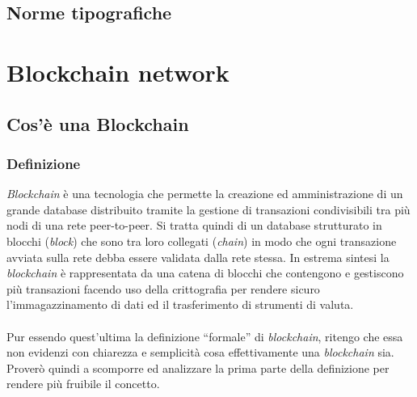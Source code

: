 \documentclass[11pt]{thesistemp}
\begin{document}
\subsection{Norme tipografiche}


\pagebreak
\section{Blockchain network}

\subsection{Cos'è una Blockchain}

\subsubsection{Definizione}

\textit{Blockchain} è una tecnologia che permette la creazione ed amministrazione di un grande database
distribuito tramite la gestione di transazioni condivisibili tra più nodi di una rete peer-to-peer.
Si tratta quindi di un database strutturato in blocchi (\textit{block}) che sono tra loro collegati (\textit{chain}) in modo che ogni transazione avviata sulla rete debba essere validata dalla rete stessa. 
In estrema sintesi la \textit{blockchain} è rappresentata da una catena di blocchi che
contengono e gestiscono più transazioni facendo uso della crittografia per rendere sicuro
l’immagazzinamento di dati ed il trasferimento di strumenti di valuta.\\\\
Pur essendo quest'ultima la definizione ``formale'' di \textit{blockchain}, ritengo che essa non evidenzi con chiarezza e semplicità cosa effettivamente una \textit{blockchain} sia.\\
Proverò quindi a scomporre ed analizzare la prima parte della definizione per rendere più fruibile il concetto.
\end{document}
